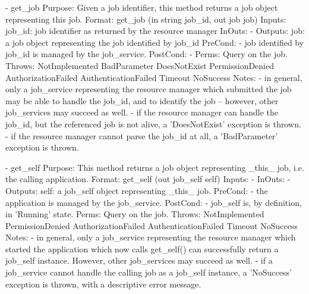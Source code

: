 \begin{myspec}
 
    - get_job
      Purpose:  Given a job identifier, this method returns a
                job object representing this job.
      Format:   get_job             (in  string job_id,
                                     out job    job)
      Inputs:   job_id:              job identifier as returned
                                     by the resource manager
      InOuts:   -
      Outputs:  job:                 a job object representing
                                     the job identified by
                                     job_id
      PreCond:  - job identified by job_id is managed by the
                  job_service.
      PostCond: - 
      Perms:    Query on the job.
      Throws:   NotImplemented
                BadParameter
                DoesNotExist
                PermissionDenied
                AuthorizationFailed
                AuthenticationFailed
                Timeout
                NoSuccess
      Notes:    - in general, only a job_service representing the
                  resource manager which submitted the job may be
                  able to handle the job_id, and to identify the
                  job -- however, other job_services may succeed
                  as well.
                - if the resource manager can handle the job_id,
                  but the referenced job is not alive, a 
                  'DoesNotExist' exception is thrown.
                - if the resource manager cannot parse the job_id
                  at all, a 'BadParameter' exception is thrown.
 
 
    - get_self
      Purpose:  This method returns a job object representing
                _this_ job, i.e. the calling application.
      Format:   get_self            (out job_self  self)
      Inputs:   -
      InOuts:   -
      Outputs:  self:                a job_self object 
                                     representing _this_ job.
      PreCond:  - the application is managed by the job_service.
      PostCond: - job_self is, by definition, in 'Running' 
                  state.
      Perms:    Query on the job.
      Throws:   NotImplemented
                PermissionDenied
                AuthorizationFailed
                AuthenticationFailed
                Timeout
                NoSuccess
      Notes:    - in general, only a job_service representing the
                  resource manager which started the application
                  which now calls get_self() can successfully
                  return a job_self instance.  However, other
                  job_services may succeed as well.
                - if a job_service cannot handle the calling job
                  as a job_self instance, a 'NoSuccess' exception
                  is thrown, with a descriptive error message.
 \end{myspec}
 
